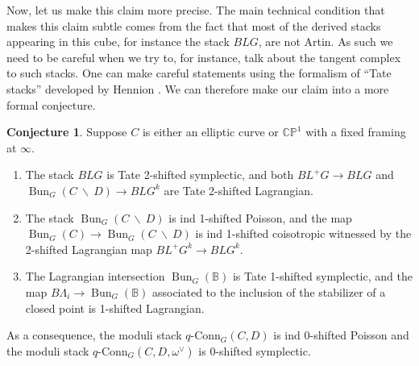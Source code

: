 \documentclass[11pt, oneside, reqno]{amsart}
\theoremstyle{definition} \newtheorem{definition}{Definition}[section]
\newtheorem{conjecture}[definition]{Conjecture}
\theoremstyle{definition} \newtheorem{remark}[definition]{Remark}
\theoremstyle{definition} \newtheorem{remarks}[definition]{Remarks}
\theoremstyle{definition} \newtheorem{question}[definition]{Question}
\theoremstyle{definition} \newtheorem*{note}{Note}
\theoremstyle{definition} \newtheorem{example}[definition]{Example}
\theoremstyle{definition} \newtheorem{examples}[definition]{Examples}
\newcommand{\bb}[1]{\mathbb{#1}}
\newcommand{\bs}{\ \backslash \ }
\DeclareMathOperator{\bun}{Bun}
\newcommand{\qconn}{q\text{-Conn}}
\begin{document}
Now, let us make this claim more precise.  The main technical condition that makes this claim subtle comes from the fact that most of the derived stacks appearing in this cube, for instance the stack $BLG$, are not Artin.  As such we need to be careful when we try to, for instance, talk about the tangent complex to such stacks.  One can make careful statements using the formalism of ``Tate stacks'' developed by Hennion \cite{Hennion}.  We can therefore make our claim into a more formal conjecture.

\begin{conjecture}
Suppose $C$ is either an elliptic curve or $\bb{CP}^1$ with a fixed framing at $\infty$.
\begin{enumerate}
\item The stack $BLG$ is Tate 2-shifted symplectic, and both $BL^+G \to BLG$ and $\bun_G(C \bs D) \to BLG^k$ are Tate 2-shifted Lagrangian.  
\item The stack $\bun_G(C \bs D)$ is ind 1-shifted Poisson, and the map $\bun_G(C) \to \bun_G(C \bs D)$ is ind 1-shifted coisotropic witnessed by the 2-shifted Lagrangian map $BL^+G^k \to BLG^k$.
\item The Lagrangian intersection $\bun_G(\bb B)$ is Tate 1-shifted symplectic, and the map $B\Lambda_i \to \bun_G(\bb B)$ associated to the inclusion of the stabilizer of a closed point is 1-shifted Lagrangian.
\end{enumerate}
As a consequence, the moduli stack $\qconn_G(C,D)$ is ind 0-shifted Poisson and the moduli stack $\qconn_G(C,D, \omega^\vee)$ is 0-shifted symplectic.
\end{conjecture}
\end{document}
